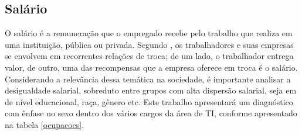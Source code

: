 \subsection{Salário}

O salário é a remuneração que o empregado recebe pelo trabalho que realiza em uma instituição, pública ou privada. Segundo \cite{kryscynski2021firm}, os trabalhadores e suas empresas se envolvem em recorrentes relações de troca; de um lado, o trabalhador entrega valor, de outro, uma das recompensas que a empresa oferece em troca é o salário.
Considerando a relevância dessa temática na sociedade, é importante analisar a 
 desigualdade salarial, sobreduto entre grupos com alta dispersão salarial, seja em de nível educacional, raça, gênero etc. Este trabalho apresentará um diagnóstico com ênfase no sexo dentro dos vários cargos da área de TI, conforme apresentado na tabela \ref{ocupacoes}. 